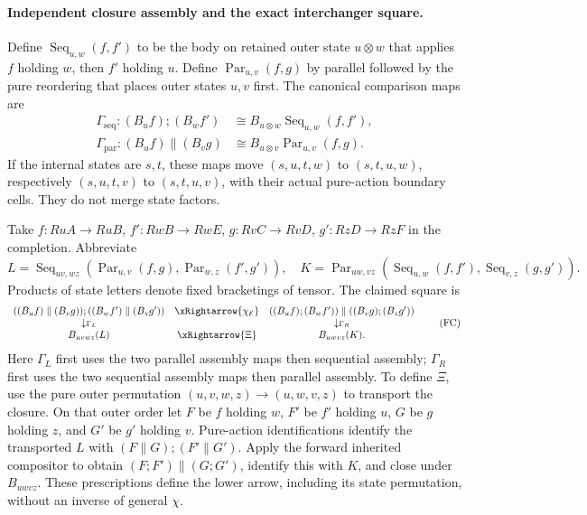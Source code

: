 \documentclass[11pt]{article}
\begin{document}
\paragraph{Independent closure assembly and the exact interchanger square.}
Define $\operatorname{Seq}_{u,w}(f,f')$ to be the body on retained outer state $u\otimes w$ that applies $f$ holding $w$, then $f'$ holding $u$. Define $\operatorname{Par}_{u,v}(f,g)$ by parallel followed by the pure reordering that places outer states $u,v$ first. The canonical comparison maps are
\begin{align*}
 \Gamma_{\mathrm{seq}}:(B_u f);(B_w f')
 &\cong B_{u\otimes w}\operatorname{Seq}_{u,w}(f,f'),\\
 \Gamma_{\mathrm{par}}:(B_u f)\parallel(B_v g)
 &\cong B_{u\otimes v}\operatorname{Par}_{u,v}(f,g).
\end{align*}
If the internal states are $s,t$, these maps move $(s,u,t,w)$ to $(s,t,u,w)$, respectively $(s,u,t,v)$ to $(s,t,u,v)$, with their actual pure-action boundary cells. They do not merge state factors.

Take $f:Ru A\to Ru B$, $f':Rw B\to Rw E$, $g:Rv C\to Rv D$, $g':Rz D\to Rz F$ in the completion. Abbreviate
\[
 L=\operatorname{Seq}_{uv,wz}(\operatorname{Par}_{u,v}(f,g),
                                  \operatorname{Par}_{w,z}(f',g')),
\quad
 K=\operatorname{Par}_{uw,vz}(\operatorname{Seq}_{u,w}(f,f'),
                                  \operatorname{Seq}_{v,z}(g,g')).
\]
Products of state letters denote fixed bracketings of tensor. The claimed square is
\[
\begin{array}{ccc}
 ((B_uf)\parallel(B_vg));((B_wf')\parallel(B_zg'))
 &\xRightarrow{\chi_{\mathcal E}}&
 ((B_uf);(B_wf'))\parallel((B_vg);(B_zg'))\\
 \downarrow\scriptstyle{\Gamma_L}&&\downarrow\scriptstyle{\Gamma_R}\\
 B_{uv wz}(L)&\xRightarrow{\Xi}&B_{uw vz}(K).
\end{array}                                                   \tag{FC}
\]
Here $\Gamma_L$ first uses the two parallel assembly maps then sequential assembly; $\Gamma_R$ first uses the two sequential assembly maps then parallel assembly. To define $\Xi$, use the pure outer permutation $(u,v,w,z)\to(u,w,v,z)$ to transport the closure. On that outer order let $F$ be $f$ holding $w$, $F'$ be $f'$ holding $u$, $G$ be $g$ holding $z$, and $G'$ be $g'$ holding $v$. Pure-action identifications identify the transported $L$ with $(F\parallel G);(F'\parallel G')$. Apply the forward inherited compositor to obtain $(F;F')\parallel(G;G')$, identify this with $K$, and close under $B_{uwvz}$. These prescriptions define the lower arrow, including its state permutation, without an inverse of general $\chi$.
\end{document}
